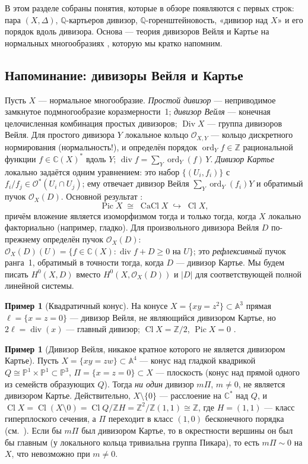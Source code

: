 \documentclass[11pt,a4paper]{article}
\theoremstyle{plain}
\theoremstyle{definition}
\newtheorem{example}[theorem]{Пример}
\theoremstyle{remark}
\renewcommand{\C}{\mathbb{C}}
\newcommand{\Z}{\mathbb{Z}}
\newcommand{\Q}{\mathbb{Q}}
\newcommand{\PP}{\mathbb{P}}
\newcommand{\A}{\mathbb{A}}
\newcommand{\cO}{\mathcal{O}}
\DeclareMathOperator{\Pic}{Pic}
\DeclareMathOperator{\Cl}{Cl}
\DeclareMathOperator{\CaCl}{CaCl}
\DeclareMathOperator{\Div}{Div}
\DeclareMathOperator{\divv}{div}
\DeclareMathOperator{\ord}{ord}
\begin{document}
В этом разделе собраны понятия, которые в обзоре \cite{DeV} появляются с первых строк: пара
$(X,\Delta)$, $\Q$-картьеров дивизор, $\Q$-горенштейновость, «дивизор над $X$» и его порядок
вдоль дивизора. Основа --- теория дивизоров Вейля и Картье на нормальных многообразиях
\cite[\S\,1]{AG}, которую мы кратко напомним.

\subsection{Напоминание: дивизоры Вейля и Картье}

Пусть $X$ --- нормальное многообразие. \emph{Простой дивизор} --- неприводимое замкнутое
подмногообразие коразмерности~1; \emph{дивизор Вейля} --- конечная целочисленная комбинация
простых дивизоров; $\Div X$ --- группа дивизоров Вейля. Для простого дивизора $Y$ локальное кольцо
$\cO_{X,Y}$ --- кольцо дискретного нормирования (нормальность!), и определён порядок
$\ord_Y f\in\Z$ рациональной функции $f\in\C(X)^*$ вдоль $Y$; $\divv f=\sum_Y\ord_Y(f)\,Y$.
\emph{Дивизор Картье} локально задаётся одним уравнением: это набор $\{(U_i,f_i)\}$ с
$f_i/f_j\in\cO^*(U_i\cap U_j)$; ему отвечает дивизор Вейля $\sum_Y\ord_Y(f_i)Y$ и обратимый пучок
$\cO_X(D)$. Основной результат \cite[теорема~1.10]{AG}:
\[
\Pic X\;\cong\;\CaCl X\;\hookrightarrow\;\Cl X,
\]
причём вложение является изоморфизмом тогда и только тогда, когда $X$ локально факториально
(например, гладко). Для произвольного дивизора Вейля $D$ по-прежнему определён пучок
$\cO_X(D)$: $\cO_X(D)(U)=\{f\in\C(X):\divv f+D\ge0\text{ на }U\}$; это \emph{рефлексивный} пучок
ранга~1, обратимый в точности тогда, когда $D$ --- дивизор Картье. Мы будем писать $H^0(X,D)$
вместо $H^0(X,\cO_X(D))$ и $|D|$ для соответствующей полной линейной системы.

\begin{example}[Квадратичный конус]\label{ex:cone-divisors}
На конусе $X=\{xy=z^2\}\subset\A^3$ прямая $\ell=\{x=z=0\}$ --- дивизор Вейля, не являющийся
дивизором Картье, но $2\ell=\divv(x)$ --- главный дивизор; $\Cl X=\Z/2$, $\Pic X=0$
\cite[пример~1.12]{AG}.
\end{example}

\begin{example}[Дивизор Вейля, никакое кратное которого не является дивизором Картье]\label{ex:nonQCartier}
Пусть $X=\{xy=zw\}\subset\A^4$ --- конус над гладкой квадрикой $Q\cong\PP^1\times\PP^1\subset\PP^3$,
$\Pi=\{x=z=0\}\subset X$ --- плоскость (конус над прямой одного из семейств образующих $Q$).
Тогда \emph{ни один} дивизор $m\Pi$, $m\ne0$, не является дивизором Картье. Действительно,
$X\setminus\{0\}$ --- расслоение на $\C^*$ над $Q$, и $\Cl X=\Cl(X\setminus0)=\Cl Q/\Z H=
\Z^2/\Z(1,1)\cong\Z$, где $H=(1,1)$ --- класс гиперплоского сечения, а $\Pi$ переходит в класс
$(1,0)$ бесконечного порядка (см.~\cite[II, упр.~6.3]{Ha}). Если бы $m\Pi$ был дивизором Картье,
то в окрестности вершины он был бы главным (у локального кольца тривиальна группа Пикара), то
есть $m\Pi\sim0$ на $X$, что невозможно при $m\ne0$.
\end{example}
\end{document}
